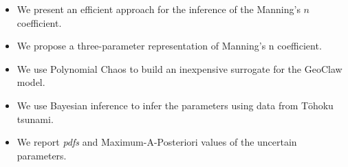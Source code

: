 \documentclass[12pt]{article}
\newcommand{\geoclaw}{{\sc GeoClaw}\xspace}
\newcommand{\tohoku}{T\={o}hoku\xspace}
\begin{document}
\begin{itemize}
\item  We present an efficient approach for the inference
of the Manning's $n$ coefficient.
\item  We propose a three-parameter representation of Manning's n coefficient.
\item We use Polynomial Chaos to build an inexpensive surrogate for the \geoclaw model.
\item We use Bayesian inference to infer the parameters using data from \tohoku tsunami.
\item We report \textit{pdfs} and Maximum-A-Posteriori values of the uncertain parameters.
\end{itemize}
\end{document}
